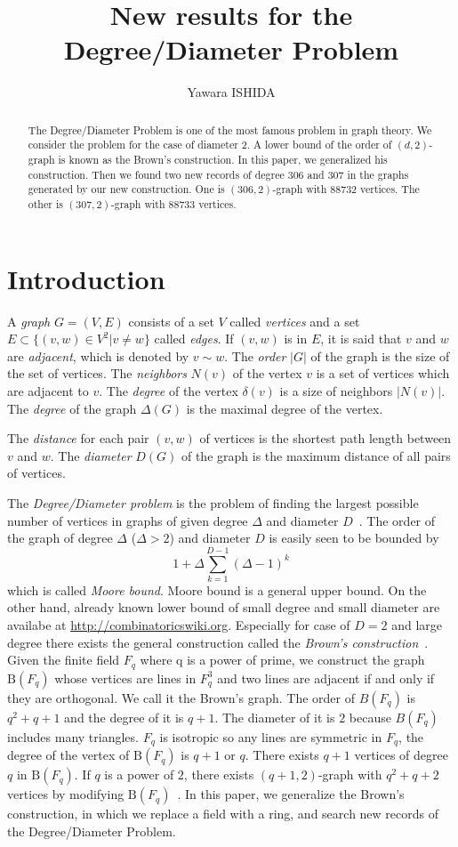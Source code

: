 \documentclass{article}
\title{New results for the Degree/Diameter Problem}
\author{Yawara ISHIDA}
\newcommand{\B}{\mathrm{B}}
\begin{document}
\maketitle
\begin{abstract}
The Degree/Diameter Problem is one of the most famous problem in graph theory. 
We consider the problem for the case of diameter 2.
A lower bound of the order of $(d,2)$-graph is known as the Brown's construction.
In this paper, we generalized his construction.
Then we found two new records of degree $306$ and $307$ in the graphs generated by our new construction.
One is $(306,2)$-graph with $88732$ vertices.
The other is $(307,2)$-graph with $88733$ vertices.
\end{abstract}

\section{Introduction}
A {\it graph} $G=(V,E)$ consists of a set $V$ called {\it vertices} and a set $E \subset \{(v,w) \in V^2 | v \neq w \}$ called {\it edges}.
If $(v,w)$ is in $E$, it is said that $v$ and $w$ are {\it adjacent}, which is denoted by $v \sim w$.
The {\it order} $|G|$ of the graph is the size of the set of vertices. 
The {\it neighbors} $N(v)$ of the vertex $v$ is a set of vertices which are adjacent to $v$.
The {\it degree} of the vertex $\delta(v)$ is a size of neighbors $| N(v) |$.  
The {\it degree} of the graph $\Delta(G)$ is the maximal degree  of the vertex.
\iffalse
The graph is {\it regular} if every vertex's degree are same.
\fi
The {\it distance} for each pair $(v,w)$ of vertices is the shortest path length between $v$ and $w$. 
The {\it diameter} $D(G)$ of the graph is the  maximum distance of all pairs of vertices. 

The {\it Degree/Diameter problem} is the problem of finding the largest possible number of vertices in graphs of given degree $\Delta$ and diameter $D$~\cite{MilSir2005}. 
The order of the graph of degree $\Delta$ ($\Delta > 2$) and diameter $D$ is easily seen to be bounded by 
\[ 1 + \Delta \sum_{k=1}^{D-1} (\Delta - 1)^k\]
which is called {\it Moore bound}.
Moore bound is a general upper bound. 
On the other hand, already known lower bound of small degree and small diameter are availabe at \url{http://combinatoricswiki.org}. 
Especially for case of $D=2$ and large degree there exists the general construction called the {\it Brown's construction}~\cite{MilSir2005}.
Given the finite field $F_q$ where q is a power of prime, we construct the graph $\B(F_q)$ whose vertices are lines in $F_q^3$ and two lines are adjacent if and only if they are orthogonal. 
We call it the Brown's graph.
The order of $B(F_q)$ is $q^2+q+1$ and the degree of it is $q+1$. The diameter of it is $2$ because $B(F_q)$ includes many triangles. 
$F_q$ is isotropic so any lines are symmetric in $F_q$, the degree of the vertex of $\B(F_q)$ is $q+1$ or $q$. 
There exists $q+1$ vertices of degree $q$ in $\B(F_q)$.
If $q$ is a power of $2$, there exists $(q+1,2)$-graph with $q^2+q+2$ vertices by modifying $\B(F_q)$~\cite{journals/networks/ErdosFH80}. 
In this paper, we generalize the Brown's construction, in which we replace a field with a ring, and search new records of the Degree/Diameter Problem.
\end{document}
